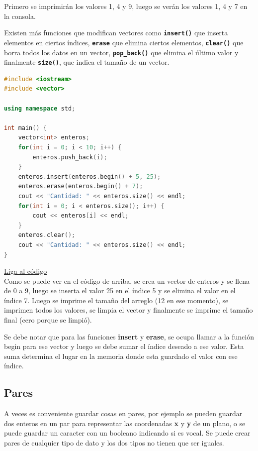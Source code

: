 \documentclass{article}
\begin{document}
Primero se imprimirán los valores 1, 4 y 9, luego se verán los valores 1, 4 y 7 en la consola.

Existen más funciones que modifican vectores como \textbf{\lstinline{insert()}} que inserta elementos en ciertos índices, \textbf{\lstinline{erase}} que elimina ciertos elementos, \textbf{\lstinline{clear()}} que borra todos los datos en un vector, \textbf{\lstinline{pop_back()}} que elimina el último valor y finalmente \textbf{\lstinline{size()}}, que indica el tamaño de un vector.

\begin{lstlisting}[language=C++, title=Jugando con vectores]
#include <iostream>
#include <vector>

using namespace std;

int main() {
	vector<int> enteros;
	for(int i = 0; i < 10; i++) {
		enteros.push_back(i);
	}
	enteros.insert(enteros.begin() + 5, 25);
	enteros.erase(enteros.begin() + 7);
	cout << "Cantidad: " << enteros.size() << endl;
	for(int i = 0; i < enteros.size(); i++) {
		cout << enteros[i] << endl;
	}
	enteros.clear();
	cout << "Cantidad: " << enteros.size() << endl;
}
\end{lstlisting}
\href{https://repl.it/@Jamesscn/Juego-de-Vectores}{Liga al código}\\

Como se puede ver en el código de arriba, se crea un vector de enteros y se llena de 0 a 9, luego se inserta el valor 25 en el índice 5 y se elimina el valor en el índice 7. Luego se imprime el tamaño del arreglo (12 en ese momento), se imprimen todos los valores, se limpia el vector y finalmente se imprime el tamaño final (cero porque se limpió).

Se debe notar que para las funciones \textbf{insert} y \textbf{erase}, se ocupa llamar a la función begin para ese vector y luego se debe sumar el índice deseado a ese valor. Esta suma determina el lugar en la memoria donde esta guardado el valor con ese índice.

\subsection{Pares}

A veces es conveniente guardar cosas en pares, por ejemplo se pueden guardar dos enteros en un par para representar las coordenadas \textbf{x} y \textbf{y} de un plano, o se puede guardar un caracter con un booleano indicando si es vocal. Se puede crear pares de cualquier tipo de dato y los dos tipos no tienen que ser iguales.
\end{document}
